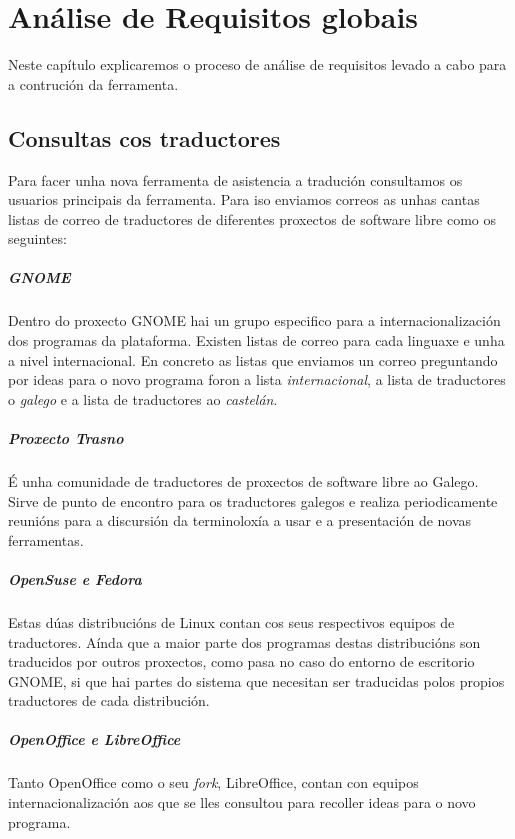 \chapter[Análise de Requisitos]{Análise de Requisitos globais}

Neste capítulo explicaremos o proceso de análise de requisitos levado a cabo para a contrución da ferramenta.

\section{Consultas cos traductores}
Para facer unha nova ferramenta de asistencia a tradución consultamos os usuarios principais da ferramenta. Para iso enviamos correos as unhas cantas listas de correo de traductores de diferentes proxectos de software libre como os seguintes:

\paragraph{GNOME} Dentro do proxecto GNOME hai un grupo especifico para a internacionalización dos programas da plataforma. Existen listas de correo para cada linguaxe e unha a nivel internacional. En concreto as listas que enviamos un correo preguntando por ideas para o novo programa foron a lista \emph{internacional}, a lista de traductores o \emph{galego} e a lista de traductores ao \emph{castelán}.

\paragraph{Proxecto Trasno} É unha comunidade de traductores de proxectos de software libre ao Galego. Sirve de punto de encontro para os traductores galegos e realiza periodicamente reunións para a discursión da terminoloxía a usar e a presentación de novas ferramentas.

\paragraph{OpenSuse e Fedora} Estas dúas distribucións de Linux contan cos seus respectivos equipos de traductores. Aínda que a maior parte dos programas destas distribucións son traducidos por outros proxectos, como pasa no caso do entorno de escritorio GNOME, si que hai partes do sistema que necesitan ser traducidas polos propios traductores de cada distribución.

\paragraph{OpenOffice e LibreOffice} Tanto OpenOffice como o seu \emph{fork}, LibreOffice, contan con equipos internacionalización aos que se lles consultou para recoller ideas para o novo programa.

